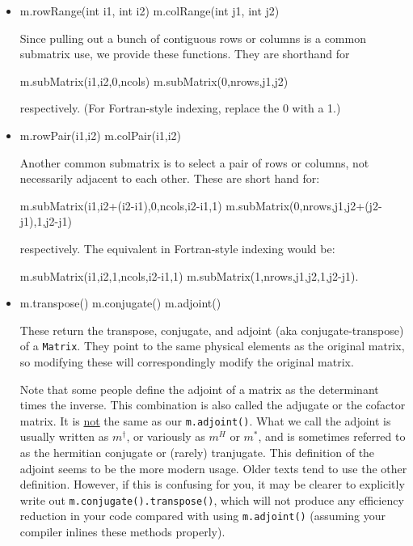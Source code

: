 \documentclass[twoside,letterpaper,11pt]{article}
\renewcommand{\tt}[1]{{\lstinline {#1}}}
\begin{document}
\begin{itemize}
\item
\begin{tmvcode}
m.rowRange(int i1, int i2)
m.colRange(int j1, int j2)
\end{tmvcode}
Since pulling out a bunch of contiguous rows or columns is a common 
submatrix use, we provide these functions.  They are shorthand for
\begin{tmvcode}
m.subMatrix(i1,i2,0,ncols)
m.subMatrix(0,nrows,j1,j2)
\end{tmvcode}
respectively.  (For Fortran-style indexing, replace the 0 with a 1.)

\item
\begin{tmvcode}
m.rowPair(i1,i2)
m.colPair(i1,i2)
\end{tmvcode}
Another common submatrix is to select a pair of rows or columns, not 
necessarily adjacent to each other.  These are short hand for:
\begin{tmvcode}
m.subMatrix(i1,i2+(i2-i1),0,ncols,i2-i1,1)
m.subMatrix(0,nrows,j1,j2+(j2-j1),1,j2-j1)
\end{tmvcode}
respectively.  The equivalent in Fortran-style indexing would be:
\begin{tmvcode}
m.subMatrix(i1,i2,1,ncols,i2-i1,1)
m.subMatrix(1,nrows,j1,j2,1,j2-j1).
\end{tmvcode}

\item
\begin{tmvcode}
m.transpose()
m.conjugate()
m.adjoint()
\end{tmvcode}
These return the transpose, conjugate, and adjoint (aka conjugate-transpose) 
of a \tt{Matrix}.  They point to the 
same physical elements as the original matrix, so modifying these will
correspondingly modify the original matrix.

Note that some people define the adjoint of a matrix as the determinant times
the inverse.  This combination is also called the adjugate or the cofactor matrix.
It is \underline{not} the same as our \tt{m.adjoint()}.  What we call the adjoint 
is usually written as $m^\dagger$, or variously as $m^H$ or $m^*$, 
and is sometimes referred to as the hermitian conjugate
or (rarely) tranjugate.  This definition of the adjoint seems to be the more modern
usage.  Older texts tend to use the other definition.  However, if this is confusing
for you, it may be clearer to explicitly write out \tt{m.conjugate().transpose()},
which will not produce any efficiency reduction in your code compared with using
\tt{m.adjoint()} (assuming your compiler inlines these methods properly).


\end{itemize}
\end{document}
